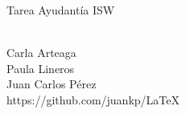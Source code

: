 \documentclass[10pt,a4paper]{report}
\begin{document}
\begin{center}
\begin{huge}
\centering
Tarea Ayudant\'ia ISW\\\
\end{huge}

Carla Arteaga\\
Paula Lineros\\
Juan Carlos P\'erez\\
https://github.com/juankp/LaTeX
\end{center}







\end{document}
